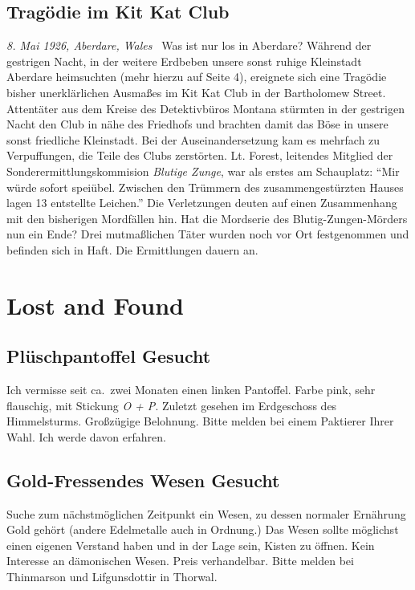 \documentclass[final]{multiversum}
\begin{document}
\subsection{Tragödie im Kit Kat Club}
\textit{8. Mai 1926, Aberdare, Wales} \textendash\ Was ist nur los in Aberdare?
Während der gestrigen Nacht, in der weitere Erdbeben unsere sonst ruhige
Kleinstadt Aberdare heimsuchten (mehr hierzu auf Seite 4), ereignete sich eine
Tragödie bisher unerklärlichen Ausmaßes im Kit Kat Club in der Bartholomew
Street. Attentäter aus dem Kreise des Detektivbüros Montana stürmten in der
gestrigen Nacht den Club in nähe des Friedhofs und brachten damit das Böse in
unsere sonst friedliche Kleinstadt. Bei der Auseinandersetzung kam es mehrfach
zu Verpuffungen, die Teile des Clubs zerstörten. Lt. Forest, leitendes Mitglied
der Sonderermittlungskommision \emph{Blutige Zunge}, war als erstes am
Schauplatz: \enquote{Mir würde sofort speiübel. Zwischen den Trümmern des
zusammengestürzten Hauses lagen 13 entstellte Leichen.} Die Verletzungen deuten
auf einen Zusammenhang mit den bisherigen Mordfällen hin. Hat die Mordserie des
Blutig-Zungen-Mörders nun ein Ende? Drei mutmaßlichen Täter wurden noch vor Ort
festgenommen und befinden sich in Haft. Die Ermittlungen dauern an.


\section{Lost and Found}
\subsection{Plüschpantoffel Gesucht}
Ich vermisse seit ca.\ zwei Monaten einen linken Pantoffel.  Farbe pink, sehr
flauschig, mit Stickung \emph{O + P}.  Zuletzt gesehen im Erdgeschoss des
Himmelsturms.  Großzügige Belohnung.  Bitte melden bei einem Paktierer Ihrer Wahl.
Ich werde davon erfahren.

\subsection{Gold-Fressendes Wesen Gesucht}
Suche zum nächstmöglichen Zeitpunkt ein Wesen, zu dessen normaler Ernährung Gold
gehört (andere Edelmetalle auch in Ordnung.) Das Wesen sollte möglichst einen
eigenen Verstand haben und in der Lage sein, Kisten zu öffnen.  Kein Interesse
an dämonischen Wesen.  Preis verhandelbar.  Bitte melden bei Thinmarson und
Lifgunsdottir in Thorwal.
\end{document}
